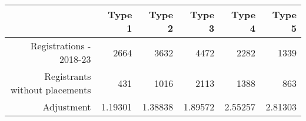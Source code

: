\begin{tabular}{rrrrrr}
  \hline
   & \textbf{Type 1} & \textbf{Type 2} & \textbf{Type 3} & \textbf{Type 4} & \textbf{Type 5} \\\hline
  Registrations - 2018-23 & 2664 & 3632 & 4472 & 2282 & 1339 \\
  Registrants without placements & 431 & 1016 & 2113 & 1388 & 863 \\
  Adjustment & 1.19301 & 1.38838 & 1.89572 & 2.55257 & 2.81303 \\\hline
\end{tabular}
